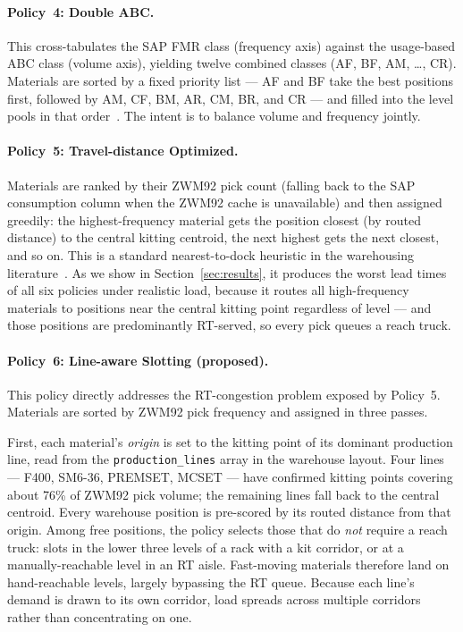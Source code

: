 \paragraph{Policy~4: Double ABC.}
This cross-tabulates the SAP FMR class (frequency axis) against the
usage-based ABC class (volume axis), yielding twelve combined classes (AF,
BF, AM, \ldots, CR). Materials are sorted by a fixed priority list --- AF and
BF take the best positions first, followed by AM, CF, BM, AR, CM, BR, and
CR --- and filled into the level pools in that order~\cite{flores1986}. The
intent is to balance volume and frequency jointly.

\paragraph{Policy~5: Travel-distance Optimized.}
Materials are ranked by their ZWM92 pick count (falling back to the SAP
consumption column when the ZWM92 cache is unavailable) and then assigned
greedily: the highest-frequency material gets the position closest (by
routed distance) to the central kitting centroid, the next highest gets the
next closest, and so on. This is a standard nearest-to-dock heuristic in the
warehousing literature~\cite{hausman1976, bartholdi2014}. As we show in
Section~\ref{sec:results}, it produces the worst lead times of all six
policies under realistic load, because it routes all high-frequency
materials to positions near the central kitting point regardless of level ---
and those positions are predominantly RT-served, so every pick queues a reach
truck.

\paragraph{Policy~6: Line-aware Slotting (proposed).}
This policy directly addresses the RT-congestion problem exposed by Policy~5.
Materials are sorted by ZWM92 pick frequency and assigned in three passes.

First, each material's \emph{origin} is set to the kitting point of its
dominant production line, read from the \texttt{production\_lines} array in
the warehouse layout. Four lines --- F400, SM6-36, PREMSET, MCSET --- have
confirmed kitting points covering about 76\% of ZWM92 pick volume; the
remaining lines fall back to the central centroid. Every warehouse position
is pre-scored by its routed distance from that origin. Among free positions,
the policy selects those that do \emph{not} require a reach truck: slots in
the lower three levels of a rack with a kit corridor, or at a
manually-reachable level in an RT aisle. Fast-moving materials therefore land
on hand-reachable levels, largely bypassing the RT queue. Because each
line's demand is drawn to its own corridor, load spreads across multiple
corridors rather than concentrating on one.

